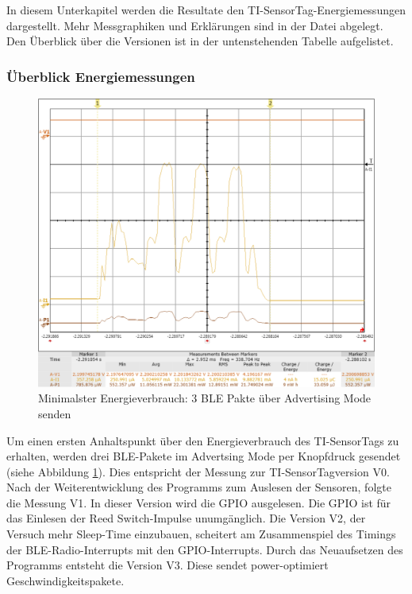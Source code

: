 In diesem Unterkapitel werden die Resultate den TI-SensorTag-Energiemessungen dargestellt. Mehr Messgraphiken und Erklärungen sind in der Datei \cite{messung_energie_sensortag} abgelegt. Den Überblick über die Versionen ist in der untenstehenden Tabelle aufgelistet. 


\subsubsection{Überblick Energiemessungen}\label{erst_EMessungen}

\begin{figure}[ht]
    \includegraphics[width=1.0\textwidth]{3Vorgehen/imag/v0Send33uJ.png} 
    \caption{Minimalster Energieverbrauch: 3 BLE Pakte über Advertising Mode senden}
    \label{BLE_send}
\end{figure}

Um einen ersten Anhaltspunkt über den Energieverbrauch des TI-SensorTags zu erhalten, werden drei BLE-Pakete im Advertsing Mode per Knopfdruck gesendet (siehe Abbildung \ref{BLE_send}). Dies entspricht der Messung zur TI-SensorTagversion V0. Nach der Weiterentwicklung des Programms zum Auslesen der Sensoren, folgte die Messung V1. In dieser Version wird die GPIO ausgelesen. Die GPIO ist für das Einlesen der Reed Switch-Impulse unumgänglich. Die Version V2, der Versuch mehr Sleep-Time einzubauen, scheitert am Zusammenspiel des Timings der BLE-Radio-Interrupts mit den GPIO-Interrupts. Durch das Neuaufsetzen des Programms entsteht die Version V3. Diese sendet power-optimiert Geschwindigkeitspakete. 

